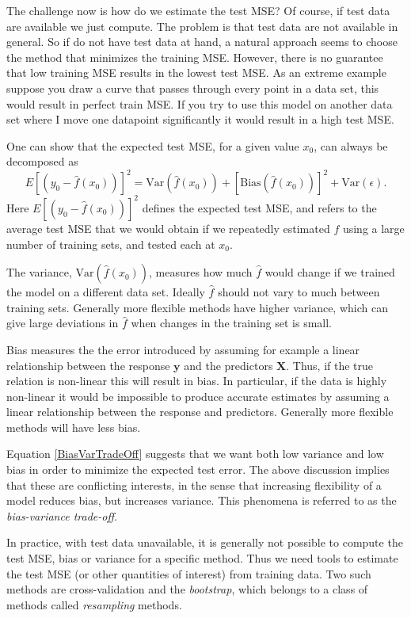 \documentclass[a4paper]{article}
\begin{document}
\begin{multicols}{2}
The challenge now is how do we estimate the test MSE? Of course, if test data are available we just compute. The problem is  
that test data are not available in general. So if do not have test data at hand, a natural approach seems to choose 
the method that minimizes the training MSE. However, there is no guarantee that low training MSE results in the lowest test MSE. 
As an extreme example suppose you draw a curve that passes through every point in a data set, this would result in perfect train 
MSE. If you try to use this model on another data set where I move one datapoint significantly it would result in a high test MSE.

One can show that the expected test MSE, for a given value $x_0$, can always be decomposed as 
\begin{equation}
 E[(y_0 - \hat{f}(x_0))]^2 = \text{Var}(\hat{f}(x_0)) + [\text{Bias}(\hat{f}(x_0))]^2 + \text{Var}(\epsilon) \label{BiasVarTradeOff}.
\end{equation}
Here $E[(y_0 - \hat{f}(x_0))]^2$ defines the expected test MSE, and refers
to the average test MSE that we would obtain if we repeatedly estimated $f$ using a large number of training sets, 
and tested each at $x_0$. 

The variance, $\text{Var}(\hat{f}(x_0))$, measures how much $\hat{f}$ would change if we trained the 
model on a different data set. Ideally $\hat{f}$ should not vary to much between training sets. Generally more flexible methods 
have higher variance, which can give large deviations in $\hat{f}$ when changes in the training set is small.

Bias measures the the error introduced by assuming for example a linear relationship between the response $\mathbf{y}$ and the 
predictors $\mathbf{X}$. Thus, if the true relation is non-linear this will result in bias. In particular, if the data is highly 
non-linear it would be impossible to produce accurate estimates by assuming a linear relationship between the response and predictors.
Generally more flexible methods will have less bias. 

Equation \ref{BiasVarTradeOff} suggests that we want both low variance and low bias in order to minimize the expected 
test error. The above discussion implies that these are conflicting interests, in the sense that increasing flexibility of a model 
reduces bias, but increases variance. This phenomena is referred to as the \textit{bias-variance trade-off}.

In practice, with test data unavailable, it is generally not possible to compute the test MSE, bias or variance for a specific 
method. Thus we need tools to estimate the test MSE (or other quantities of interest) from training data. Two such methods are 
cross-validation and the \textit{bootstrap}, which belongs to a class of methods called \textit{resampling} methods.


\end{multicols}
\end{document}
